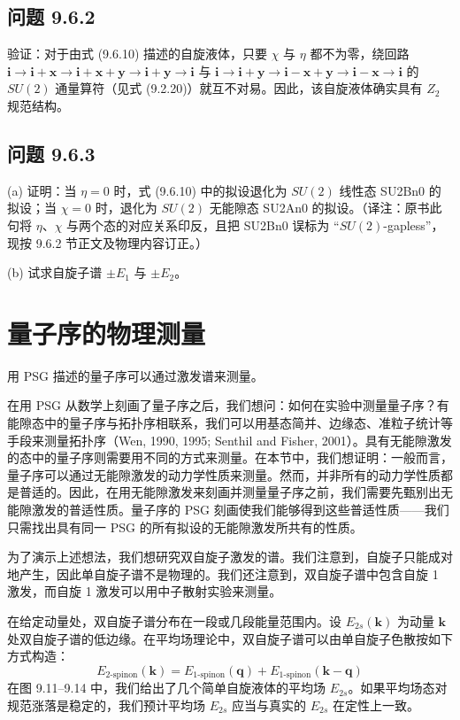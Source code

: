 \subsection*{问题 9.6.2}

验证：对于由式 (9.6.10) 描述的自旋液体，只要 $\chi$ 与 $\eta$ 都不为零，绕回路 $\pmb{i}\to\pmb{i}+\pmb{x}\to\pmb{i}+\pmb{x}+\pmb{y}\to\pmb{i}+\pmb{y}\to\pmb{i}$ 与 $\pmb{i}\to\pmb{i}+\pmb{y}\to\pmb{i}-\pmb{x}+\pmb{y}\to\pmb{i}-\pmb{x}\to\pmb{i}$ 的 $SU(2)$ 通量算符（见式 (9.2.20)）就互不对易。因此，该自旋液体确实具有 $Z_2$ 规范结构。

\subsection*{问题 9.6.3}

(a) 证明：当 $\eta=0$ 时，式 (9.6.10) 中的拟设退化为 $SU(2)$ 线性态 SU2Bn0 的拟设；当 $\chi=0$ 时，退化为 $SU(2)$ 无能隙态 SU2An0 的拟设。（译注：原书此句将 $\eta$、$\chi$ 与两个态的对应关系印反，且把 SU2Bn0 误标为 “$SU(2)$-gapless”，现按 9.6.2 节正文及物理内容订正。）

(b) 试求自旋子谱 $\pm E_1$ 与 $\pm E_2$。

\section{量子序的物理测量}

\begin{keypoints}
\item 用 PSG 描述的量子序可以通过激发谱来测量。
\end{keypoints}

在用 PSG 从数学上刻画了量子序之后，我们想问：如何在实验中测量量子序？有能隙态中的量子序与拓扑序相联系，我们可以用基态简并、边缘态、准粒子统计等手段来测量拓扑序（Wen, 1990, 1995; Senthil and Fisher, 2001）。具有无能隙激发的态中的量子序则需要用不同的方式来测量。在本节中，我们想证明：一般而言，量子序可以通过无能隙激发的动力学性质来测量。然而，并非所有的动力学性质都是普适的。因此，在用无能隙激发来刻画并测量量子序之前，我们需要先甄别出无能隙激发的普适性质。量子序的 PSG 刻画使我们能够得到这些普适性质——我们只需找出具有同一 PSG 的所有拟设的无能隙激发所共有的性质。

为了演示上述想法，我们想研究双自旋子激发的谱。我们注意到，自旋子只能成对地产生，因此单自旋子谱不是物理的。我们还注意到，双自旋子谱中包含自旋 1 激发，而自旋 1 激发可以用中子散射实验来测量。

在给定动量处，双自旋子谱分布在一段或几段能量范围内。设 $E_{2s}(\pmb{k})$ 为动量 $\pmb{k}$ 处双自旋子谱的低边缘。在平均场理论中，双自旋子谱可以由单自旋子色散按如下方式构造：
\begin{equation*}
E_{2\text{-spinon}}(\pmb{k})=E_{1\text{-spinon}}(\pmb{q})+E_{1\text{-spinon}}(\pmb{k}-\pmb{q})
\end{equation*}
在图 9.11--9.14 中，我们给出了几个简单自旋液体的平均场 $E_{2s}$。如果平均场态对规范涨落是稳定的，我们预计平均场 $E_{2s}$ 应当与真实的 $E_{2s}$ 在定性上一致。

